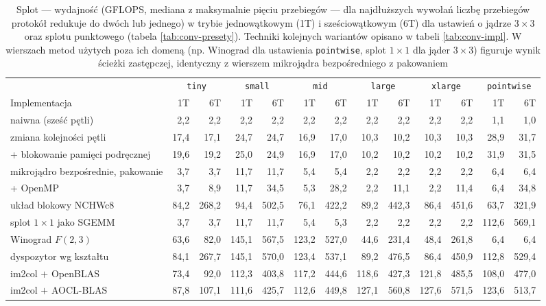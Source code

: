 \documentclass[a4paper,12pt]{book} %
\begin{document}
\begin{landscape}
\begin{table}
\centering
\caption{Splot --- wydajność (GFLOPS, mediana z maksymalnie pięciu przebiegów --- dla najdłuższych wywołań liczbę przebiegów protokół redukuje do dwóch lub jednego) w trybie jednowątkowym (1T) i sześciowątkowym (6T) dla ustawień o jądrze $3 \times 3$ oraz splotu punktowego (tabela \ref{tab:conv-presety}). Techniki kolejnych wariantów opisano w tabeli \ref{tab:conv-impl}. W wierszach metod użytych poza ich domeną (np. Winograd dla ustawienia \texttt{pointwise}, splot $1 \times 1$ dla jąder $3 \times 3$) figuruje wynik ścieżki zastępczej, identyczny z wierszem mikrojądra bezpośredniego z pakowaniem}
\label{tab:wyniki-conv-a}
\footnotesize
\setlength{\tabcolsep}{4.5pt}
\begin{tabular}{l rr rr rr rr rr rr}
\hline
 & \multicolumn{2}{c}{\texttt{tiny}} & \multicolumn{2}{c}{\texttt{small}} & \multicolumn{2}{c}{\texttt{mid}} & \multicolumn{2}{c}{\texttt{large}} & \multicolumn{2}{c}{\texttt{xlarge}} & \multicolumn{2}{c}{\texttt{pointwise}} \\
Implementacja & 1T & 6T & 1T & 6T & 1T & 6T & 1T & 6T & 1T & 6T & 1T & 6T \\
\hline
naiwna (sześć pętli)               &  2,2 &   2,2 &   2,2 &   2,2 &   2,2 &   2,2 &   2,2 &   2,2 &   2,2 &   2,2 &   1,1 &   1,0 \\
zmiana kolejności pętli            & 17,4 &  17,1 &  24,7 &  24,7 &  16,9 &  17,0 &  10,3 &  10,2 &  10,3 &  10,3 &  28,9 &  31,7 \\
{}+ blokowanie pamięci podręcznej  & 19,6 &  19,2 &  25,0 &  24,9 &  16,9 &  17,0 &  10,2 &  10,2 &  10,2 &  10,2 &  31,9 &  31,5 \\
mikrojądro bezpośrednie, pakowanie &  3,7 &   3,7 &  11,7 &  11,7 &   5,4 &   5,4 &   2,2 &   2,2 &   2,2 &   2,2 &   6,4 &   6,4 \\
{}+ OpenMP                         &  3,7 &   8,9 &  11,7 &  34,5 &   5,3 &  28,2 &   2,2 &  11,1 &   2,2 &  11,4 &   6,4 &  34,8 \\
układ blokowy NCHWc8               & 84,2 & 268,2 &  94,4 & 502,5 &  76,1 & 422,2 &  89,2 & 442,3 &  86,4 & 451,6 &  63,7 & 321,9 \\
splot $1 \times 1$ jako SGEMM      &  3,7 &   3,7 &  11,7 &  11,7 &   5,4 &   5,3 &   2,2 &   2,2 &   2,2 &   2,2 & 112,6 & 569,1 \\
Winograd $F(2{,}3)$                & 63,6 &  82,0 & 145,1 & 567,5 & 123,2 & 527,0 &  44,6 & 231,4 &  48,4 & 261,8 &   6,4 &   6,4 \\
dyspozytor wg kształtu             & 84,1 & 267,7 & 145,1 & 570,0 & 123,4 & 537,1 &  89,2 & 476,5 &  86,4 & 450,9 & 112,8 & 529,4 \\
im2col $+$ OpenBLAS                & 73,4 &  92,0 & 112,3 & 403,8 & 117,2 & 444,6 & 118,6 & 427,3 & 121,8 & 485,5 & 108,0 & 477,0 \\
im2col $+$ AOCL-BLAS               & 87,8 & 107,1 & 111,6 & 425,7 & 112,6 & 449,8 & 127,1 & 560,8 & 127,6 & 571,5 & 123,6 & 513,7 \\
\hline
\end{tabular}
\end{table}
\end{landscape}
\end{document}

